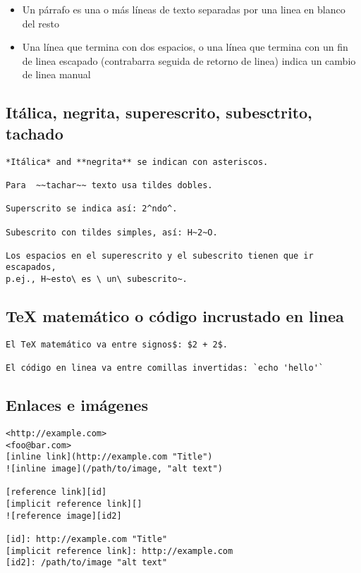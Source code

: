 \documentclass[12pt,spanish,]{article}
\providecommand{\tightlist}{%
  \setlength{\itemsep}{0pt}\setlength{\parskip}{0pt}}
\begin{document}
\begin{itemize}
\tightlist
\item
  Un párrafo es una o más líneas de texto separadas por una linea en
  blanco del resto
\item
  Una línea que termina con dos espacios, o una línea que termina con un
  fin de linea escapado (contrabarra seguida de retorno de linea) indica
  un cambio de linea manual
\end{itemize}

\hypertarget{ituxe1lica-negrita-superescrito-subesctrito-tachado}{%
\subsection{Itálica, negrita, superescrito, subesctrito,
tachado}\label{ituxe1lica-negrita-superescrito-subesctrito-tachado}}

\begin{verbatim}
*Itálica* and **negrita** se indican con asteriscos.

Para  ~~tachar~~ texto usa tildes dobles.

Superscrito se indica así: 2^ndo^.

Subescrito con tildes simples, así: H~2~O.

Los espacios en el superescrito y el subescrito tienen que ir escapados,
p.ej., H~esto\ es \ un\ subescrito~.
\end{verbatim}

\hypertarget{tex-matemuxe1tico-o-cuxf3digo-incrustado-en-linea}{%
\subsection{TeX matemático o código incrustado en
linea}\label{tex-matemuxe1tico-o-cuxf3digo-incrustado-en-linea}}

\begin{verbatim}
El TeX matemático va entre signos$: $2 + 2$.

El código en linea va entre comillas invertidas: `echo 'hello'`
\end{verbatim}

\hypertarget{enlaces-e-imuxe1genes}{%
\subsection{Enlaces e imágenes}\label{enlaces-e-imuxe1genes}}

\begin{verbatim}
<http://example.com>
<foo@bar.com>
[inline link](http://example.com "Title")
![inline image](/path/to/image, "alt text")

[reference link][id]
[implicit reference link][]
![reference image][id2]

[id]: http://example.com "Title"
[implicit reference link]: http://example.com
[id2]: /path/to/image "alt text"
\end{verbatim}
\end{document}
